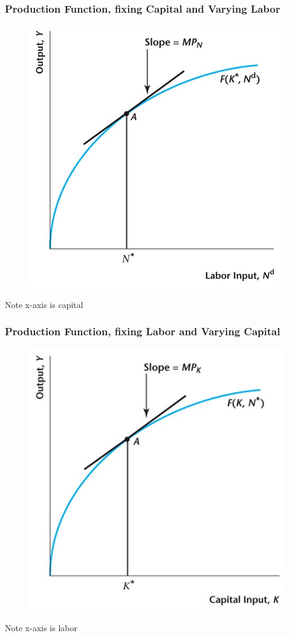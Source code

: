 \documentclass{beamer}
\begin{document}
\begin{frame}
\frametitle[alignment=center]{Production Function, fixing Capital and Varying Labor}
\begin{figure}
\centering
\includegraphics[scale=0.5]{Figures/W_Fig_4pt12.png}
\end{figure}
Note x-axis is capital
\end{frame}

\begin{frame}
\frametitle[alignment=center]{Production Function, fixing Labor and Varying Capital}
\begin{figure}
\centering
\includegraphics[scale=0.5]{Figures/W_Fig_4pt13.png}
\end{figure}
Note x-axis is labor
\end{frame}
\end{document}
